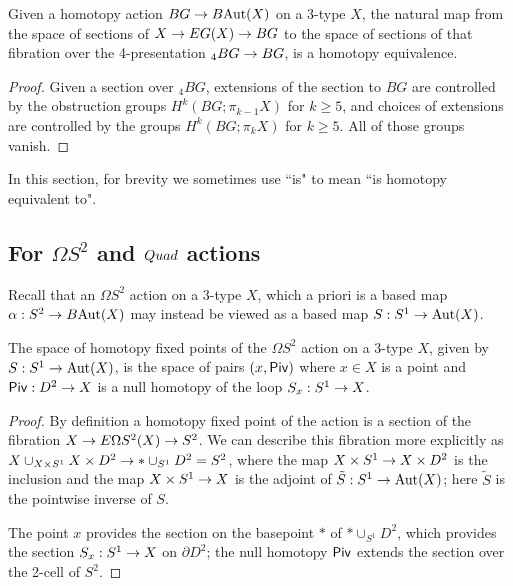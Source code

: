 \documentclass{amsart}
\begin{document}
\begin{proposition} 
\label{prop-hofptrunc}
Given a homotopy action $BG \rightarrow B\mathrm{Aut}(X)$ on a 3-type $X$, the natural map from the space of sections of $X \rightarrow EG(X) \rightarrow BG$ to the space of sections of that fibration over the 4-presentation ${}_4 BG \rightarrow BG$, is a homotopy equivalence.
\end{proposition}
\begin{proof}
Given a section over ${}_4 BG$, extensions of the section to $BG$ are controlled by the obstruction groups $H^k(BG;\pi_{k-1} X)$ for $k \geq 5$, and choices of extensions are controlled by the groups $H^k(BG;\pi_k X)$ for $k \geq 5$.  All of those groups vanish.
\end{proof}

In this section, for brevity we sometimes use ``is" to mean ``is homotopy equivalent to".

\subsection{For $\Omega S^2$ and $Quad$ actions}

Recall that an $\Omega S^2$ action on a 3-type $X$, which a priori is a based map $\alpha: S^2 \rightarrow B\mathrm{Aut}(X)$ may instead be viewed as a based map $S: S^1 \rightarrow \mathrm{Aut}(X)$.



\begin{proposition}
The space of homotopy fixed points of the $\Omega S^2$ action on a 3-type $X$, given by $S: S^1 \rightarrow \mathrm{Aut}(X)$, is the space of pairs $(x,\mathsf{Piv})$ where $x \in X$ is a point and $\mathsf{Piv}: D^2 \rightarrow X$ is a null homotopy of the loop $S_x: S^1 \rightarrow X$.
\end{proposition}
\begin{proof}
By definition a homotopy fixed point of the action is a section of the fibration $X \rightarrow E\Omega S^2(X) \rightarrow S^2$.  We can describe this fibration more explicitly as $X \cup_{X \times S^1} X \times D^2 \rightarrow \ast \cup_{S^1} D^2 = S^2$, where the map $X \times S^1 \rightarrow X \times D^2$ is the inclusion and the map $X \times S^1 \rightarrow X$ is the adjoint of $\tilde{S}: S^1 \rightarrow \mathrm{Aut}(X)$; here $\tilde{S}$ is the pointwise inverse of $S$.  %

The point $x$ provides the section on the basepoint $\ast$ of $\ast \cup_{S^1} D^2$, which provides the section $S_x: S^1 \rightarrow X$ on $\partial D^2$; the null homotopy $\mathsf{Piv}$ extends the section over the 2-cell of $S^2$.
\end{proof}
\end{document}
